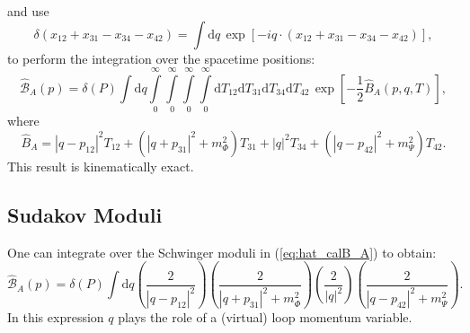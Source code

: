 and use
\begin{equation}
	\delta(x_{12} + x_{31} - x_{34} - x_{42}) = \int \mathrm{d}q \, \exp{\left[-i q \cdot (x_{12} + x_{31} - x_{34} - x_{42}) \right]},
\end{equation}
to perform the integration over the spacetime positions:
\begin{equation}
	\widehat{\mathcal{B}}_{A}(p) = \delta(P) \int \mathrm{d}q \int\limits_{0}^{\infty} \int\limits_{0}^{\infty} \int\limits_{0}^{\infty} \int\limits_{0}^{\infty} \mathrm{d}T_{12} \mathrm{d}T_{31} \mathrm{d}T_{34} \mathrm{d}T_{42} \, \exp{\left[- \frac{1}{2} \widehat{B}_{A}(p, q, T) \right]},
	\label{eq:hat_calB_A}
\end{equation}
where
\begin{equation}
	\widehat{B}_{A} = |q - p_{12}|^{2} T_{12} + \left(|q + p_{31}|^{2} + m_{\Phi}^{2} \right) T_{31} + |q|^{2} T_{34} + \left(|q - p_{42}|^{2} + m_{\Psi}^{2} \right) T_{42}.
\end{equation}
This result is kinematically exact.
\subsection{Sudakov Moduli}
One can integrate over the Schwinger moduli in (\ref{eq:hat_calB_A}) to obtain:
\begin{equation}
	\widehat{\mathcal{B}}_{A}(p) = \delta(P) \int \mathrm{d}q \left( \frac{2}{|q - p_{12}|^{2}} \right) \left( \frac{2}{|q + p_{31}|^{2} + m_{\Phi}^{2}} \right) \left( \frac{2}{|q|^{2}} \right) \left( \frac{2}{|q - p_{42}|^{2} + m_{\Psi}^{2}} \right).
	\label{eq:sudakov_B_A}
\end{equation}
In this expression $q$ plays the role of a (virtual) loop momentum variable.

